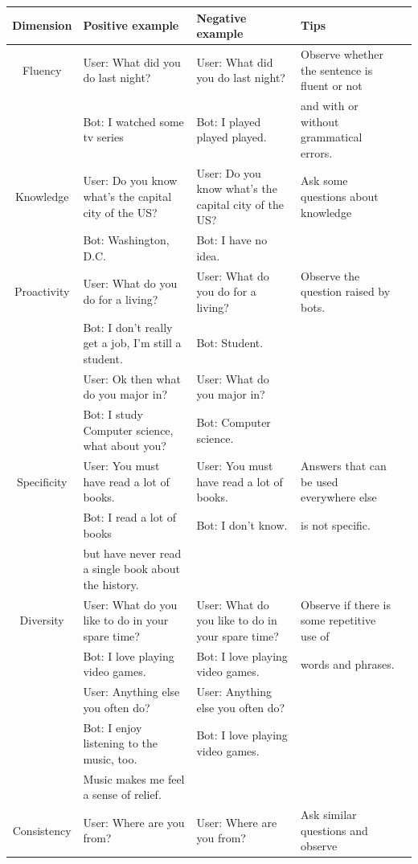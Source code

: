 \begin{table}[th]
\centering
\scriptsize
\begin{tabular}{cllll}
\toprule
\textbf{Dimension}  &\textbf{Positive example}&\textbf{Negative example}&\textbf{Tips} \\ \midrule
Fluency  & 
User: What did you do last night? &User: What did you do last night?& Observe whether the sentence is fluent or not \\
& Bot: I watched some tv series&Bot: I played played played.& and with or without grammatical errors.
\\
\midrule
Knowledge &   User: Do you know what's the capital city of the US?&User: Do you know what’s the capital city of the US? &Ask some questions about knowledge\\
&  Bot: Washington, D.C.& Bot: I have no idea. &\\
\midrule
Proactivity &User: What do you do for a living?
& User: What do you do for a living? &Observe the question raised by bots. \\
& Bot: I don't really get a job, I'm still a student.&Bot: Student.&
\\
& User: Ok then what do you major in? &User: What do you major in? &\\
& Bot: I study Computer science, what about you? 
&Bot: Computer science. &\\
\midrule
Specificity &
User: You must have read a lot of books. &User: You must have read a lot of books.
& Answers that can be used everywhere else \\
& Bot:  I read a lot of books
 & Bot: I don't know. & is not specific.\\
&  but have never read a single book about the history. & & \\
\midrule
Diversity  &User: What do you like to do in your spare time? & 
User: What do you like to do in your spare time?&
Observe if there is some repetitive use of \\
&Bot: I love playing video games. & Bot: I love playing video games. & words and phrases. \\
&User: Anything else you often do?  & User: Anything else you often do?  & \\
&Bot:  I enjoy listening to the music, too. & Bot:  I love playing video games. & \\
&Music makes me feel a sense of relief. & & \\
\midrule
Consistency  &
User: Where are you from? &User: Where are you from? &Ask similar questions and observe \\

\end{tabular}
\end{table}

